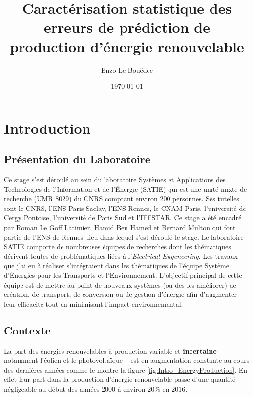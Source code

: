 \documentclass[12pt, french]{report}
\title{Caractérisation statistique des erreurs de prédiction de production d'énergie renouvelable}
\author{Enzo Le Bouëdec}
\date{\today}
\begin{document}
\maketitle
\tableofcontents

\printnomenclature

\chapter{Introduction}
\section{Présentation du Laboratoire}
Ce stage s'est déroulé au sein du laboratoire Systèmes et Applications des Technologies de l'Information et de l'Énergie (SATIE) qui est une unité mixte de recherche (UMR 8029) du CNRS comptant environ 200 personnes. Ses tutelles sont le CNRS, l'ENS Paris Saclay, l'ENS Rennes, le CNAM Paris, l'université de Cergy Pontoise, l'université de Paris Sud et l'IFFSTAR. Ce stage a été encadré par Roman Le Goff Latimier, Hamid Ben Hamed et Bernard Multon qui font partie de l'ENS de Rennes, lieu dans lequel s'est déroulé le stage. Le laboratoire SATIE comporte de nombreuses équipes de recherches dont les thématiques dérivent toutes de problématiques liées à l'\textit{Electrical Engeneering}. Les travaux que j'ai eu à réaliser s'intégraient dans les thématiques de l'équipe Système d'Énergies pour les Transports et l'Environnement. L'objectif principal de cette équipe est de mettre au point de nouveaux systèmes (ou des les améliorer) de création, de transport, de conversion ou de gestion d'énergie afin d'augmenter leur efficacité tout en minimisant l'impact environnemental.


\section{Contexte}

La part des énergies renouvelables à production variable et \textbf{incertaine} -- notamment l'éolien et le photovoltaïque -- est en augmentation constante au cours des dernières années comme le montre la figure \ref{fig:Intro_EnergyProduction}. En effet leur part dans la production d'énergie renouvelable passe d'une quantité négligeable au début des années 2000 à environ $20 \%$ en 2016.
\end{document}
